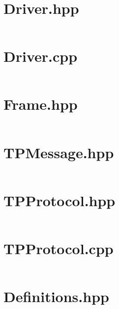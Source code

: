 \documentclass[a4paper,nobib,justified]{tufte-book}
\begin{document}
\section*{Driver.hpp}
\inputminted{cpp}{code/full-files/Driver.hpp}
\newpage
\section*{Driver.cpp}
\inputminted{cpp}{code/full-files/Driver.cpp}
\newpage
\section*{Frame.hpp}
\inputminted{cpp}{code/full-files/Frame.hpp}
\newpage
\section*{TPMessage.hpp}
\inputminted{cpp}{code/full-files/TPMessage.hpp}
\newpage
\section*{TPProtocol.hpp}
\inputminted{cpp}{code/full-files/TPProtocol.hpp}
\newpage
\section*{TPProtocol.cpp}
\inputminted{cpp}{code/full-files/TPProtocol.cpp}
\newpage
\section*{Definitions.hpp}
\inputminted{cpp}{code/full-files/Definitions.hpp}
\end{document}
